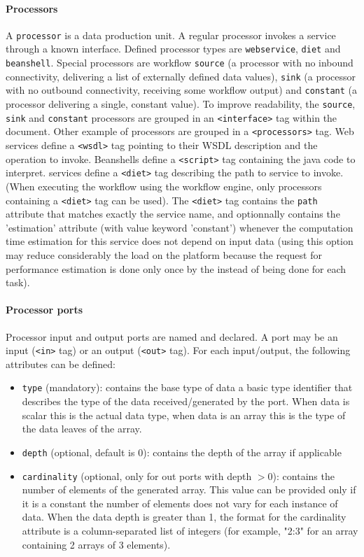 \paragraph{Processors} A \texttt{processor} is a data production unit. 
A regular processor invokes a service through a known interface. Defined
processor types are \texttt{webservice}, \texttt{diet} and
\texttt{beanshell}. Special processors are workflow \texttt{source} (a
processor with no inbound connectivity, delivering a list of externally defined
data values), \texttt{sink} (a processor with no outbound connectivity,
receiving some workflow output) and \texttt{constant} (a processor delivering a
single, constant value). To improve readability, the \texttt{source},
\texttt{sink} and \texttt{constant} processors are grouped in an
\texttt{<interface>} tag within the document. Other example of processors are
grouped in a \texttt{<processors>} tag. Web services define a \texttt{<wsdl>}
tag pointing to their WSDL description and the operation to invoke. Beanshells
define a \texttt{<script>} tag containing the java code to interpret. \diet
services define a \texttt{<diet>} tag describing the path to service to
invoke. (When executing the workflow using the \diet workflow engine, only
processors containing a \texttt{<diet>} tag can be used). The \texttt{<diet>}
tag contains the \texttt{path} attribute that matches exactly the \diet service
name, and optionnally contains the 'estimation' attribute (with value keyword
'constant') whenever the computation time estimation for this service does not
depend on input data (using this option may reduce considerably the load on the
\diet platform because the request for performance estimation is done only once
by the \madag instead of being done for each task).

\paragraph{Processor ports} 
Processor input and output ports are named and declared. A port may be an input
(\texttt{<in>} tag) or an output (\texttt{<out>} tag). For each input/output, the
following attributes can be defined:
\begin{itemize}
\item \texttt{type} (mandatory): contains the base type of data \ie a basic
type identifier that describes the type of the data received/generated by the
  port. When data is scalar this is the actual data type, when data is an array
  this is the type of the data leaves of the array.
\item \texttt{depth} (optional, default is 0): contains the depth of the array
  if applicable
\item \texttt{cardinality} (optional, only for out ports with depth $>0$):
  contains the number of elements of the generated array. This value can be
  provided only if it is a constant \ie the number of elements does not vary
  for each instance of data. When the data depth is greater than 1, the format
  for the cardinality attribute is a column-separated list of integers (for
  example, "2:3" for an array containing 2 arrays of 3 elements).
\end{itemize}

